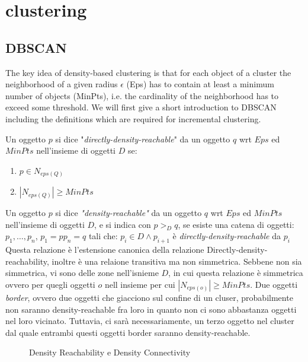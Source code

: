 \chapter{clustering}
 
\section{DBSCAN}
\theoremstyle{plain}
The key idea of density-based clustering \cite{Ester96adensity} is that for each 		\cite{Mendes:2011:DSS:2063518.2063519}
object of a cluster the neighborhood of a given radius $\epsilon$ (Eps)
has to contain at least a minimum number of objects
(MinPts), i.e. the cardinality of the neighborhood has to exceed
some threshold.
We will first give a short introduction to DBSCAN including
the definitions which are required for incremental 
clustering.
\begin{definizione}
\label{def:ddr}
Un oggetto $p$ si dice 	"\emph{directly-density-reachable}" da un oggetto $q$ wrt $Eps$ ed $MinPts$ nell'insieme di oggetti $D$ se:
\begin{enumerate}
\item $p \in N_{eps(Q)}$
\item $|N_{eps(Q)}| \ge MinPts$
\end{enumerate}
\end{definizione}
\begin{definizione}
\label{def:dr} 
Un oggetto   $p$ si dice 	\emph{"density-reachable"} da un oggetto $q$ wrt $Eps$ ed $MinPts$ nell'insieme di oggetti $D$, e si  indica con \emph{$p>_{D}q$}, se esiste una catena di oggetti: $p_1,\dots,p_n$, $p_1=p p_n=q$ tali che:  $p_{i} \in D  \land p_{i+1}$ è \emph{directly-density-reachable} da $p_{i}$
Questa relazione è l'estensione canonica della relazione Directly-density-reachability, inoltre è una relaione transitiva ma non simmetrica. Sebbene non sia simmetrica, vi sono delle zone nell'isnieme $D$, in cui questa relazione è simmetrica ovvero  per quegli oggetti $o$ nell insieme per cui $|N_{eps(o)}| \ge MinPts$. Due oggetti \emph{border}, ovvero due oggetti che giacciono sul confine di un cluser, probabilmente non saranno density-reachable fra loro in quanto non ci sono abbastanza oggetti nel loro vicinato. Tuttavia, ci sarà necessariamente, un terzo oggetto nel cluster dal quale entrambi questi  oggetti border saranno density-reachable.
\end{definizione}
\begin{figure}
\caption{Density Reachability e Density Connectivity}
\label{fig:dens-reach}
\end{figure}
